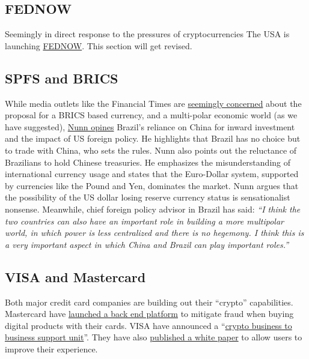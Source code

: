 \subsection{FEDNOW}
Seemingly in direct response to the pressures of cryptocurrencies The USA is launching \href{https://www.federalreserve.gov/paymentsystems/fednow_about.htm}{FEDNOW}. This section will get revised.
\subsection{SPFS and BRICS}
While media outlets like the Financial Times are \href{https://www.ft.com/content/f8f3b2cd-6690-4f26-b81e-e972751c8799}{seemingly concerned} about the proposal for a BRICS based currency, and a multi-polar economic world (as we have suggested), \href{https://twitter.com/robfnunn/status/1641743274997055490}{Nunn opines} Brazil's reliance on China for inward investment and the impact of US foreign policy. He highlights that Brazil has no choice but to trade with China, who sets the rules. Nunn also points out the reluctance of Brazilians to hold Chinese treasuries. He emphasizes the misunderstanding of international currency usage and states that the Euro-Dollar system, supported by currencies like the Pound and Yen, dominates the market. Nunn argues that the possibility of the US dollar losing reserve currency status is sensationalist nonsense. Meanwhile, chief foreign policy advisor in Brazil has said: \textit{``I think the two countries can also have an important role in building a more multipolar world, in which power is less centralized and there is no hegemony. I think this is a very important aspect in which China and Brazil can play important roles.''}
\subsection{VISA and Mastercard}
Both major credit card companies are building out their ``crypto'' capabilities. Mastercard have \href{https://finance.yahoo.com/news/mastercard-crypto-secure-200559003.html}{launched a back end platform} to mitigate fraud when buying digital products with their cards. VISA have announced a ``\href{https://investor.visa.com/news/news-details/2021/Visa-Introduces-Crypto-Advisory-Services-to-Help-Partners-Navigate-a-New-Era-of-Money-Movement/default.aspx}{crypto business to business support unit}''. They have also \href{https://usa.visa.com/solutions/crypto/auto-payments-for-self-custodial-wallets.html}{published a white paper} to allow users to improve their experience.
